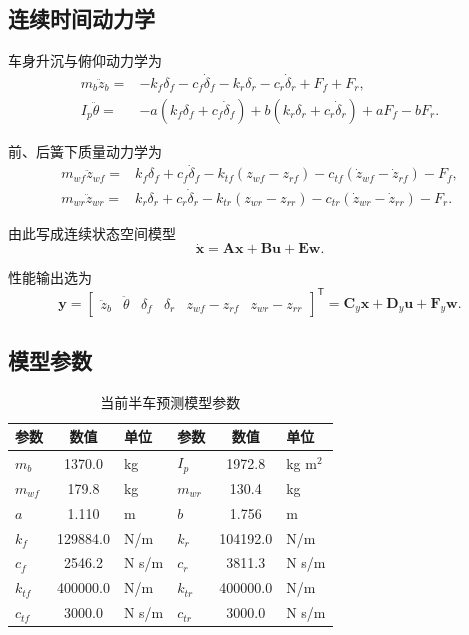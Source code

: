\documentclass[UTF8,12pt,a4paper,fontset=windows]{ctexart}
\newcommand{\vect}[1]{\bm{#1}}
\newcommand{\trans}{^{\mathsf T}}
\begin{document}
\subsection{连续时间动力学}

车身升沉与俯仰动力学为
\begin{align}
m_b\ddot z_b ={}& -k_f\delta_f-c_f\dot\delta_f-k_r\delta_r-c_r\dot\delta_r+F_f+F_r,\\
I_p\ddot\theta ={}& -a\left(k_f\delta_f+c_f\dot\delta_f\right)
 +b\left(k_r\delta_r+c_r\dot\delta_r\right)+aF_f-bF_r.
\end{align}

前、后簧下质量动力学为
\begin{align}
m_{wf}\ddot z_{wf}={}&k_f\delta_f+c_f\dot\delta_f
-k_{tf}(z_{wf}-z_{rf})-c_{tf}(\dot z_{wf}-\dot z_{rf})-F_f,\\
m_{wr}\ddot z_{wr}={}&k_r\delta_r+c_r\dot\delta_r
-k_{tr}(z_{wr}-z_{rr})-c_{tr}(\dot z_{wr}-\dot z_{rr})-F_r.
\end{align}

由此写成连续状态空间模型
\begin{equation}
\dot{\vect{x}}=\vect{A}\vect{x}+\vect{B}\vect{u}+\vect{E}\vect{w}.
\end{equation}

性能输出选为
\begin{equation}
\vect{y}=
\begin{bmatrix}
\ddot z_b & \ddot\theta & \delta_f & \delta_r & z_{wf}-z_{rf} & z_{wr}-z_{rr}
\end{bmatrix}\trans
=\vect{C}_y\vect{x}+\vect{D}_y\vect{u}+\vect{F}_y\vect{w}.
\end{equation}

\subsection{模型参数}

\begin{table}[H]
\centering
\caption{当前半车预测模型参数}
{\small\setlength{\tabcolsep}{4pt}%
\begin{tabular}{l S[table-format=6.1] l l S[table-format=6.1] l}
\toprule
参数 & {数值} & 单位 & 参数 & {数值} & 单位\\
\midrule
$m_b$  & 1370.0 & kg & $I_p$  & 1972.8 & kg m$^2$\\
$m_{wf}$ & 179.8 & kg & $m_{wr}$ & 130.4 & kg\\
$a$ & 1.110 & m & $b$ & 1.756 & m\\
$k_f$ & 129884.0 & N/m & $k_r$ & 104192.0 & N/m\\
$c_f$ & 2546.2 & N s/m & $c_r$ & 3811.3 & N s/m\\
$k_{tf}$ & 400000.0 & N/m & $k_{tr}$ & 400000.0 & N/m\\
$c_{tf}$ & 3000.0 & N s/m & $c_{tr}$ & 3000.0 & N s/m\\
\bottomrule
\end{tabular}}
\end{table}
\end{document}
